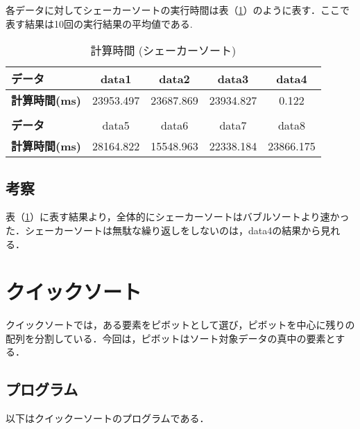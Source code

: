 \documentclass[a4j, titlepage]{jarticle}
\begin{document}
            各データに対してシェーカーソートの実行時間は表（\ref{tab:shacker}）のように表す．ここで表す結果は10回の実行結果の平均値である.

            \begin{table}[tbh]
                \caption{計算時間 (シェーカーソート)}
                \label{tab:shacker}
                \begin{center}
                    \begin{tabular}{lcccc}
                        \hline
                        \textbf{データ} & data1 & data2 &data3 &data4 \\ \hline
                        \textbf{計算時間(ms)} & 23953.497 & 23687.869 & 23934.827 & 0.122 \\ \hline
                        \\ \hline
                        \textbf{データ} & data5 &data6 &data7 &data8\\ \hline
                        \textbf{計算時間(ms)} & 28164.822 & 15548.963 & 22338.184 & 23866.175 \\ \hline
                    \end{tabular}
                \end{center}
            \end{table}
        
        \subsection{考察}
            表（\ref{tab:shacker}）に表す結果より，全体的にシェーカーソートはバブルソートより速かった．シェーカーソートは無駄な繰り返しをしないのは，data4の結果から見れる．
        

        \section{クイックソート}
            クイックソートでは，ある要素をピボットとして選び，ピボットを中心に残りの配列を分割している．今回は，ピボットはソート対象データの真中の要素とする．

        \subsection{プログラム}
            以下はクイックーソートのプログラムである．
            
\end{document}
